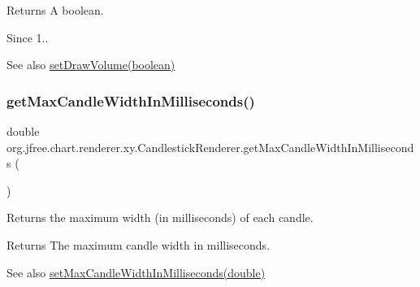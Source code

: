 \begin{DoxyReturn}{Returns}
A boolean.
\end{DoxyReturn}
\begin{DoxySince}{Since}
1..
\end{DoxySince}
\begin{DoxySeeAlso}{See also}
\mbox{\hyperlink{classorg_1_1jfree_1_1chart_1_1renderer_1_1xy_1_1_candlestick_renderer_ae3b4de230818ae0c8278052b9a1722f3}{set\+Draw\+Volume(boolean)}} 
\end{DoxySeeAlso}
\mbox{\label{classorg_1_1jfree_1_1chart_1_1renderer_1_1xy_1_1_candlestick_renderer_a6c06bc6b4e7471616cd59579e342ddb8}} 
\subsubsection{\texorpdfstring{get\+Max\+Candle\+Width\+In\+Milliseconds()}{getMaxCandleWidthInMilliseconds()}}
{\footnotesize\ttfamily double org.\+jfree.\+chart.\+renderer.\+xy.\+Candlestick\+Renderer.\+get\+Max\+Candle\+Width\+In\+Milliseconds (\begin{DoxyParamCaption}{ }\end{DoxyParamCaption})}

Returns the maximum width (in milliseconds) of each candle.

\begin{DoxyReturn}{Returns}
The maximum candle width in milliseconds.
\end{DoxyReturn}
\begin{DoxySeeAlso}{See also}
\mbox{\hyperlink{classorg_1_1jfree_1_1chart_1_1renderer_1_1xy_1_1_candlestick_renderer_a7f28bced2a25bf012d05127ac175af49}{set\+Max\+Candle\+Width\+In\+Milliseconds(double)}} 
\end{DoxySeeAlso}
\mbox{\label{classorg_1_1jfree_1_1chart_1_1renderer_1_1xy_1_1_candlestick_renderer_a14f115bf4294f88845d318372e703d0f}} 
